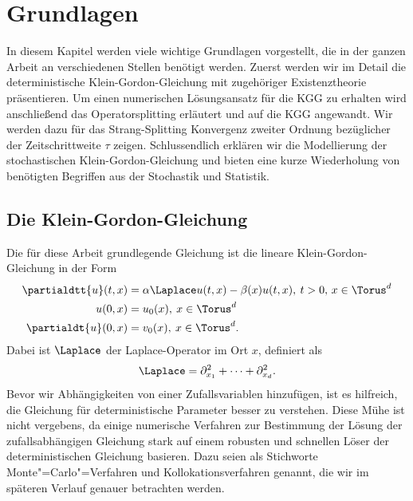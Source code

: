 
\chapter{Grundlagen}
\label{Chapter1}
In diesem Kapitel werden viele wichtige Grundlagen vorgestellt, die in der ganzen Arbeit an verschiedenen Stellen benötigt werden. Zuerst werden wir im Detail die deterministische Klein-Gordon-Gleichung mit zugehöriger Existenztheorie präsentieren. Um einen numerischen Lösungsansatz für die KGG zu erhalten wird anschließend das Operatorsplitting erläutert und auf die KGG angewandt. Wir werden dazu für das Strang-Splitting Konvergenz zweiter Ordnung bezüglicher der Zeitschrittweite $\tau$ zeigen. Schlussendlich erklären wir die Modellierung der stochastischen Klein-Gordon-Gleichung und bieten eine kurze Wiederholung von benötigten Begriffen aus der Stochastik und Statistik.

\section{Die Klein-Gordon-Gleichung}
Die für diese Arbeit grundlegende Gleichung ist die lineare Klein-Gordon-Gleichung in der Form
\begin{align}
\label{kgg}
\partialdtt{u}(t,x)&=\alpha \Laplace u(t,x) - \beta(x)u(t,x), \: t>0, \, x\in \Torus^d\\
u(0,x)&=u_0(x), \: x\in \Torus^d\\
\partialdt{u}(0,x)&=v_0(x), \: x\in \Torus^d.
\end{align}
Dabei ist $\Laplace$ der Laplace-Operator im Ort $x$, definiert als
\[\Laplace=\partial^2_{x_1}+\dots+\partial^2_{x_d}.\]
Bevor wir Abhängigkeiten von einer Zufallsvariablen hinzufügen, ist es hilfreich, die Gleichung für deterministische Parameter besser zu verstehen. Diese Mühe ist nicht vergebens, da einige numerische Verfahren zur Bestimmung der Lösung der zufallsabhängigen Gleichung stark auf einem robusten und schnellen Löser der deterministischen Gleichung basieren. Dazu seien als Stichworte Monte"=Carlo"=Verfahren und Kollokationsverfahren genannt, die wir im späteren Verlauf genauer betrachten werden.
